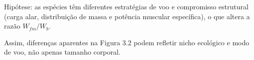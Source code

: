 Hipótese: as espécies têm diferentes estratégias de voo e compromisso estrutural (carga alar, distribuição de massa e potência muscular específica), o que altera a razão $W_{fm}/W_b$.

Assim, diferenças aparentes na Figura 3.2 podem refletir nicho ecológico e modo de voo, não apenas tamanho corporal.


